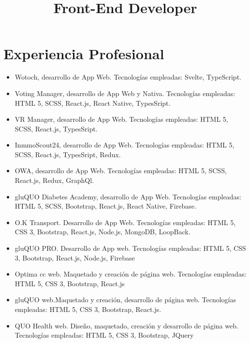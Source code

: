 \documentclass[11pt,a4paper]{moderncv}
\title{Front-End Developer}
\begin{document}
    \maketitle
    \section{Experiencia Profesional}
    {\begin{itemize}
         \item Wotoch, desarrollo de App Web. Tecnologías empleadas: Svelte, TypeScript.
         \item Voting Manager, desarrollo de App Web y Nativa. Tecnologías empleadas: HTML 5, SCSS, React.js, React Native, TypesSript.
         \item VR Manager, desarrollo de App Web. Tecnologías empleadas: HTML 5, SCSS, React.js, TypesSript.
         \item InmmoScout24, desarrollo de App Web. Tecnologías empleadas: HTML 5, SCSS, React.js, TypesSript, Redux.
    \end{itemize}
    }
    {\begin{itemize}
         \item OWA, desarrollo de App Web. Tecnologías empleadas: HTML 5, SCSS, React.js, Redux, GraphQl.
    \end{itemize}
    }
    {\begin{itemize}
         \item gluQUO Diabetes Academy, desarrollo de App Web. Tecnologías empleadas: HTML 5, SCSS, Bootstrap, React.js, React Native, Firebase.
         \item O.K Transport. Desarrollo de App Web. Tecnologías empleadas: HTML 5, CSS 3, Bootstrap, React.js, Node.js, MongoDB, LoopBack.
         \item gluQUO PRO. Desarrollo de App web. Tecnologías empleadas: HTML 5, CSS 3, Bootstrap, React.js, Node.js, Firebase
         \item Optima cc web. Maquetado y creación de página web. Tecnologías empleadas: HTML 5, CSS 3, Bootstrap, React.js
         \item gluQUO web.Maquetado y creación, desarrollo de página web. Tecnologías empleadas: HTML 5, CSS 3, Bootstrap, React.js.
         \item QUO Health web. Diseño, maquetado, creación y desarrollo de página web. Tecnologías empleadas: HTML 5, CSS 3, Bootstrap, JQuery
    \end{itemize}
    }
\end{document}
